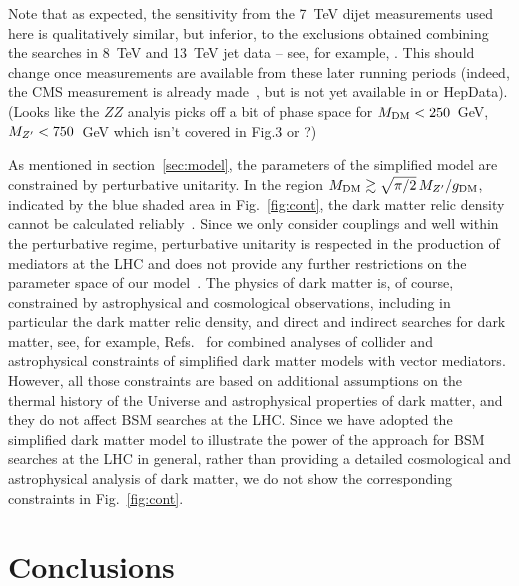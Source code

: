 \documentclass[floatfix]{article}
\begin{document}
Note that as expected, the sensitivity from the 7~TeV dijet measurements used here is qualitatively similar, but inferior, to the exclusions obtained 
combining the searches in 8~TeV and 13~TeV jet data -- see, for example, \cite{Fairbairn:2016iuf}. This should change once measurements
are available from these later running periods (indeed, the CMS measurement is already made~\cite{Khachatryan:2016wdh}, but is not yet available in \rivet or HepData).
(Looks like the $ZZ$ analyis picks off a bit of phase space for $M_{\rm DM} < 250$~GeV, $M_{Z^{\prime}} < 750$~GeV which isn't covered in Fig.3 or \cite{Fairbairn:2016iuf}?) 

As mentioned in section~\ref{sec:model},  the parameters of the simplified model are constrained by perturbative unitarity. 
In the region $M_{\rm DM} \gtrsim \sqrt{\pi/2}\, M_{Z^{\prime}}/g_{\rm DM}$, indicated by the blue shaded area in Fig.~\ref{fig:cont}, 
the dark matter relic density cannot be calculated reliably~\cite{Kahlhoefer:2015bea}. Since we only consider couplings \GDM and \GQ well within the perturbative regime, perturbative unitarity is respected in the production of mediators at the LHC 
and does not provide any further restrictions on the parameter space of our model~\cite{Englert:2016joy}. The physics of dark matter is, of course, constrained by astrophysical and cosmological observations, including in particular the dark matter relic density, and direct and indirect searches for dark matter, see, for example, Refs.~\cite{Kahlhoefer:2015bea, Heisig:2015ira,Jacques:2016dqz} for combined analyses of collider and astrophysical constraints of simplified dark matter models with vector mediators. However, all those constraints are based on additional assumptions on the thermal history of the Universe and astrophysical properties of dark matter, and they do not affect BSM searches at the LHC. Since we have adopted the simplified dark matter model to illustrate the power of the \Contur approach for BSM searches at the LHC in general, rather than providing a detailed cosmological and astrophysical analysis of dark matter, we do not show the corresponding constraints in Fig.~\ref{fig:cont}.

\section{Conclusions}\label{sec:conclusions}
\end{document}
